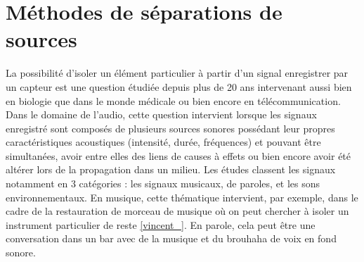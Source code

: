 \section{Méthodes de séparations de sources}
%
%
%
%
%
%
%
%

La possibilité d'isoler un élément particulier à partir d'un signal enregistrer par un capteur est une question étudiée depuis plus de 20 ans intervenant aussi bien en biologie que dans le monde médicale ou bien encore en télécommunication. Dans le domaine de l'audio, cette question intervient lorsque les signaux enregistré sont composés de plusieurs sources sonores possédant leur propres caractéristiques acoustiques (intensité, durée, fréquences) et pouvant être simultanées, avoir entre elles des liens de causes à effets ou bien encore avoir été altérer lors de la propagation dans un milieu. Les études classent les signaux notamment en 3 catégories : les signaux musicaux, de paroles, et les sons environnementaux. En musique, cette thématique intervient, par exemple, dans le cadre de la restauration de morceau de musique où on peut chercher à isoler un instrument particulier de reste \ref{vincent_}. En parole, cela peut être une conversation dans un bar avec de la musique et du brouhaha de voix en fond sonore.\\




